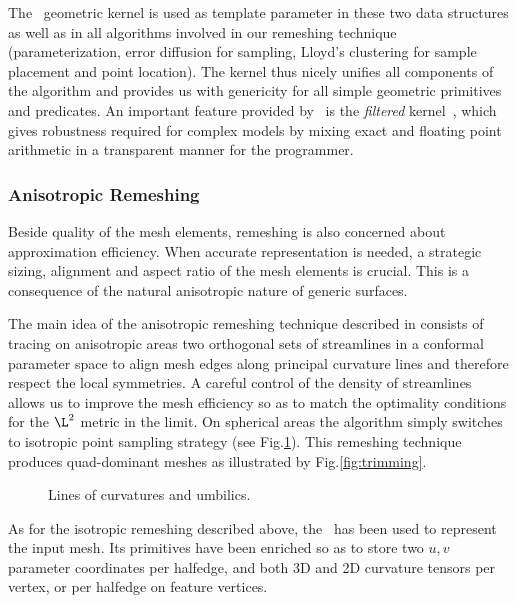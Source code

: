 The \cgal\ geometric kernel is used as template parameter in these two data
structures as well as in all algorithms involved in our remeshing
technique (parameterization, error diffusion for sampling, Lloyd's
clustering for sample placement and point location). The kernel thus
nicely unifies all components of the algorithm and provides us with
genericity for all simple geometric primitives and predicates. An
important feature provided by \cgal\ is the \emph{filtered}
kernel~\cite{bbp-iayed-01,p-iaeia-99}, which gives robustness required
for complex models by mixing exact and floating point arithmetic in a
transparent manner for the programmer.

\subsubsection{Anisotropic Remeshing}


Beside quality of the mesh elements, remeshing is also
concerned about approximation efficiency. When accurate representation is
needed, a strategic sizing, alignment and aspect ratio of the mesh
elements is crucial. This is a consequence of the natural anisotropic
nature of generic surfaces.


The main idea of the anisotropic remeshing technique described in
\cite{acdld-apr-03} consists of tracing on anisotropic areas two 
orthogonal sets of streamlines in a conformal parameter space to align
mesh edges along principal curvature lines and therefore respect the
local symmetries. A careful control of the density of streamlines
allows us to improve the mesh efficiency so as to match the optimality
conditions for the $\L^2$ metric in the limit. On spherical areas the
algorithm simply switches to isotropic point sampling strategy (see
Fig.\ref{fig:anisotropic}). This remeshing technique produces
quad-dominant meshes as illustrated by Fig.\ref{fig:trimming}.

\begin{figure}
  \centering
  \caption{Lines of curvatures and umbilics.}
  \label{fig:anisotropic}\vspace{-3mm}
\end{figure}


As for the isotropic remeshing described above, the
\cgalpoly\ has been used to represent the input mesh. Its primitives
have been enriched so as to store two $u,v$ parameter coordinates per
halfedge, and both 3D and 2D curvature tensors per vertex, or per
halfedge on feature vertices.

